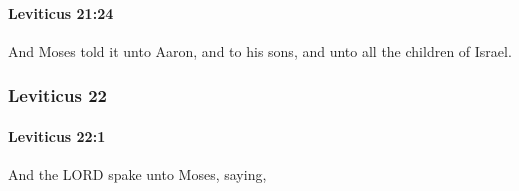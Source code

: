 		\paragraph{Leviticus 21:24} %
			\label{LEVITICUS-21-24}

			And Moses told it unto Aaron, and to his sons, and unto all the children of Israel.

	\subsubsection{Leviticus 22} %
		\label{LEVITICUS-22}

		\paragraph{Leviticus 22:1} %
			\label{LEVITICUS-22-1}

			And the LORD spake unto Moses, saying,

